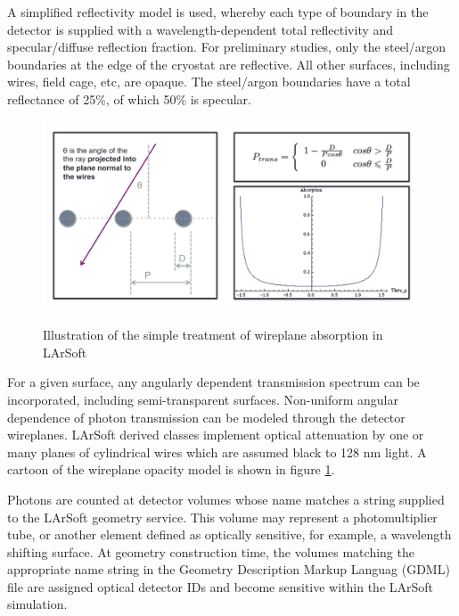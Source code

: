 \documentclass[12pt]{elsarticle}
\begin{document}
A simplified reflectivity model is used, whereby each type of boundary in the detector is supplied with a wavelength-dependent total reflectivity and specular/diffuse reflection fraction.   For  preliminary  studies,  only the  steel/argon boundaries  at  the  edge of the cryostat are  reflective. All  other  surfaces,  including  wires,  field cage,  etc,  are opaque.  The steel/argon boundaries have a total reflectance of 25\%, of which 50\% is specular\cite{reflectances}.

\begin{figure}[h]
\centering
\caption{Illustration of the simple treatment of wireplane absorption in LArSoft}
\includegraphics[width=6.0in]{./mtrls/imgs/WireplaneTransmissionCartoon.pdf}
\label{fig:wireplaneabs}
\end{figure}

For a given surface, any angularly dependent transmission spectrum can be incorporated, including semi-transparent surfaces.  Non-uniform angular dependence of photon transmission can be modeled through the detector wireplanes.    LArSoft derived classes implement optical attenuation by one or many planes of cylindrical wires which are assumed black to 128 nm light.  A cartoon of the wireplane opacity model is shown in figure \ref{fig:wireplaneabs}.

Photons are counted at detector volumes whose name matches a string supplied to the LArSoft geometry service.  This volume may represent a photomultiplier tube, or another element defined as optically sensitive, for example, a wavelength shifting surface. At geometry construction time, the volumes matching the appropriate name string in the Geometry Description Markup Languag (GDML) file are assigned optical detector IDs and become sensitive within the LArSoft simulation.
\end{document}
